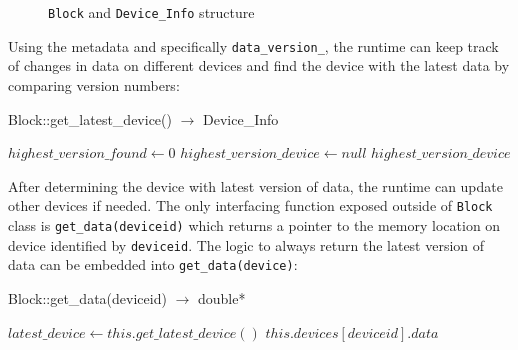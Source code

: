 \begin{figure}[h]
  \caption{\texttt{Block} and \texttt{Device\_Info} structure}\label{fig:Device_Info_Structure}
\end{figure}

Using the metadata and specifically \texttt{data\_version\_}, the runtime can keep
track of changes in data on different devices and find the device with the latest
data by comparing version numbers:

\begin{algorithm} {Block::get\_latest\_device() $\rightarrow$ Device\_Info}
  \singlespacing

  \begin{algorithmic}[1]
    \State $highest\_version\_found \gets 0$
    \State $highest\_version\_device \gets null$
    \EndIf
    \EndFor
    \State \Return $highest\_version\_device$
    \EndFunction
  \end{algorithmic}
\end{algorithm}

After determining the device with latest version of data, the runtime can update
other devices if needed. The only interfacing function exposed outside of
\texttt{Block} class is \texttt{get\_data(deviceid)} which returns a pointer to the memory
location on device identified by \texttt{deviceid}. The logic to always return
the latest version of data can be embedded into \texttt{get\_data(device)}:

\begin{algorithm}  {Block::get\_data(deviceid) $\rightarrow$ double*}
  \singlespacing

  \begin{algorithmic}[1]
    \State $latest\_device \gets this.get\_latest\_device()$
    \EndIf
    \State \Return $this.devices[deviceid].data$
    \EndFunction
  \end{algorithmic}
  \label{alg:get_data}
\end{algorithm}

